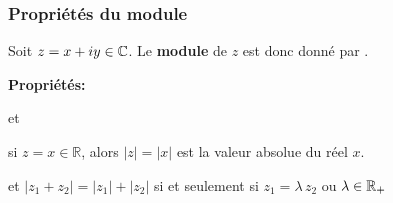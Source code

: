 \begin{frame}%
\frametitle{\bf Propri\'et\'es du module}
\medskip 

Soit $z=x+iy\in \mathbb C$. 
Le {\bf module} de $z$ est donc donné par . 
\vspace*{1mm}

{\bf Propri\'et\'es:} 
\begin{itemize}
\quad 
et 
\vspace*{2mm}

\pause
\bitem si $z=x\in{\mathbb R}$, alors $|z|=\vert x\vert$ est la valeur absolue 
du r\'eel $x$.
\vspace*{2mm}


\pause
\bitem {} \quad 
\vspace*{2mm}

\pause
\bitem {} \quad 
\vspace*{2mm}

\pause
\bitem {} 
\vspace*{1mm}

et $|z_1 +z_2|= |z_1|+|z_2|$ si et seulement si 
$z_1=\lambda\,z_2$ ou $\lambda\in\mathbb R_{+}$ 
\vspace*{2mm}

\pause
\end{itemize}

\end{frame}


